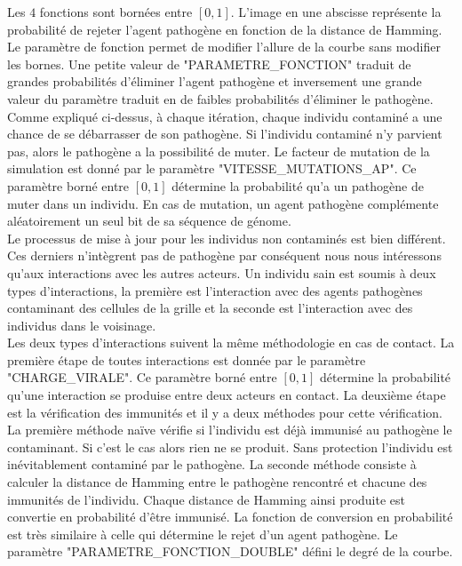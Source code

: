 Les $4$ fonctions sont bornées entre $[0,1]$. L'image en une abscisse représente la probabilité de rejeter l'agent pathogène en fonction de la distance de Hamming. Le paramètre de fonction permet de modifier l'allure de la courbe sans modifier les bornes. Une petite valeur de {\small "PARAMETRE\_FONCTION"} traduit de grandes probabilités d'éliminer l'agent pathogène et inversement une grande valeur du paramètre traduit en de faibles probabilités d'éliminer le pathogène.\\

Comme expliqué ci-dessus, à chaque itération, chaque individu contaminé a une chance de se débarrasser de son pathogène. Si l'individu contaminé n'y parvient pas, alors le pathogène a la possibilité de muter. Le facteur de mutation de la simulation est donné par le paramètre {\small "VITESSE\_MUTATIONS\_AP"}. Ce paramètre borné entre $[0,1]$ détermine la probabilité qu'a un pathogène de muter dans un individu. En cas de mutation, un agent pathogène complémente aléatoirement un seul bit de sa séquence de génome.\\

Le processus de mise à jour pour les individus non contaminés est bien différent. Ces derniers n'intègrent pas de pathogène par conséquent nous nous intéressons qu'aux interactions avec les autres acteurs. Un individu sain est soumis à deux types d'interactions, la première est l'interaction avec des agents pathogènes contaminant des cellules de la grille et la seconde est l’interaction avec des individus dans le voisinage.\\

Les deux types d'interactions suivent la même méthodologie en cas de contact. La première étape de toutes interactions est donnée par le paramètre {\small "CHARGE\_VIRALE"}. Ce paramètre borné entre $[0,1]$ détermine la probabilité qu'une interaction se produise entre deux acteurs en contact. La deuxième étape est la vérification des immunités et il y a deux méthodes pour cette vérification. La première méthode naïve vérifie si l'individu est déjà immunisé au pathogène le contaminant. Si c'est le cas alors rien ne se produit. Sans protection l'individu est inévitablement contaminé par le pathogène. La seconde méthode consiste à calculer la distance de Hamming entre le pathogène rencontré et chacune des immunités de l'individu. Chaque distance de Hamming ainsi produite est convertie en probabilité d'être immunisé. La fonction de conversion en probabilité est très similaire à celle qui détermine le rejet d'un agent pathogène. Le paramètre {\small "PARAMETRE\_FONCTION\_DOUBLE"} défini le degré de la courbe.  \\

